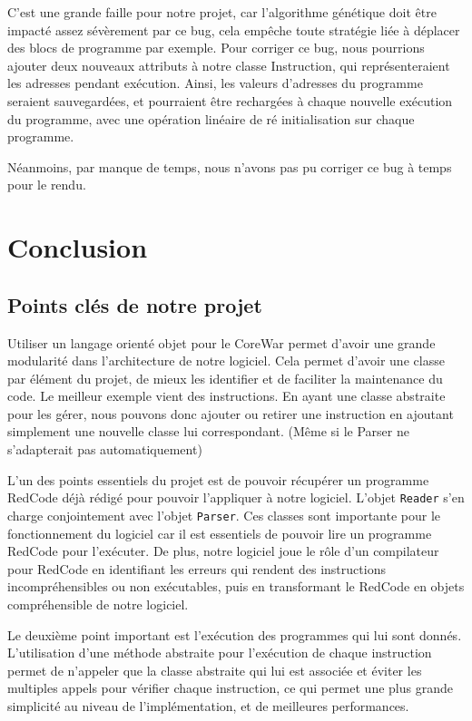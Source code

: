 \documentclass[hidelinks]{report}
\begin{document}
C'est une grande faille pour notre projet, car l'algorithme génétique doit être impacté assez sévèrement par ce bug, cela empêche toute stratégie liée à déplacer des blocs de programme par exemple. Pour corriger ce bug, nous pourrions ajouter deux nouveaux attributs à notre classe Instruction, qui représenteraient les adresses pendant exécution. Ainsi, les valeurs d'adresses du programme seraient sauvegardées, et pourraient être rechargées à chaque nouvelle exécution du programme, avec une opération linéaire de ré initialisation sur chaque programme.

Néanmoins, par manque de temps, nous n'avons pas pu corriger ce bug à temps pour le rendu.

\chapter{Conclusion}

\section{Points clés de notre projet}
Utiliser un langage orienté objet pour le CoreWar permet d'avoir une grande modularité dans l'architecture de notre logiciel. Cela permet d'avoir une classe par élément du projet, de mieux les identifier et de faciliter la maintenance du code. Le meilleur exemple vient des instructions. En ayant une classe abstraite pour les gérer, nous pouvons donc ajouter ou retirer une instruction en ajoutant simplement une nouvelle classe lui correspondant. (Même si le Parser ne s'adapterait pas automatiquement)

L'un des points essentiels du projet est de pouvoir récupérer un programme RedCode déjà rédigé pour pouvoir l'appliquer à notre logiciel. L'objet \texttt{Reader} s'en charge conjointement avec l'objet \texttt{Parser}. Ces classes sont importante pour le fonctionnement du logiciel car il est essentiels de pouvoir lire un programme RedCode pour l'exécuter. De plus, notre logiciel joue le rôle d'un compilateur pour RedCode en identifiant les erreurs qui rendent des instructions incompréhensibles ou non exécutables, puis en transformant le RedCode en objets compréhensible de notre logiciel.

Le deuxième point important est l'exécution des programmes qui lui sont donnés. L'utilisation d'une méthode abstraite pour l'exécution de chaque instruction permet de n'appeler que la classe abstraite qui lui est associée et éviter les multiples appels pour vérifier chaque instruction, ce qui permet une plus grande simplicité au niveau de l'implémentation, et de meilleures performances.
\end{document}

